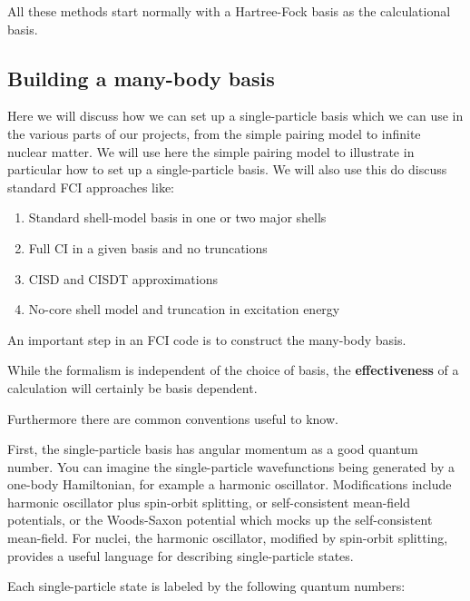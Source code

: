 \noindent
All these methods start normally with a Hartree-Fock basis as the calculational basis. 


\subsection{Building a many-body basis}

Here we will discuss how we can set up a single-particle basis which we can use in the various parts of our projects, from the simple pairing model to infinite nuclear matter. We will use here the simple pairing model to illustrate in particular how to set up a single-particle basis. We will also use this do discuss standard FCI approaches like:
\begin{enumerate}
 \item Standard shell-model basis in one or two major shells

 \item Full CI in a given basis and no truncations

 \item CISD and CISDT approximations

 \item No-core shell model and truncation in excitation energy
\end{enumerate}

\noindent
An important step in an FCI code  is to construct the many-body basis.  

While the formalism is independent of the choice of basis, the \textbf{effectiveness} of a calculation 
will certainly be basis dependent. 

Furthermore there are common conventions useful to know.

First, the single-particle basis has angular momentum as a good quantum number.  You can 
imagine the single-particle wavefunctions being generated by a one-body Hamiltonian, 
for example a harmonic oscillator.  Modifications include harmonic oscillator plus 
spin-orbit splitting, or self-consistent mean-field potentials, or the Woods-Saxon potential which mocks 
up the self-consistent mean-field. 
For nuclei, the harmonic oscillator, modified by spin-orbit splitting, provides a useful language 
for describing single-particle states.


Each single-particle state is labeled by the following quantum numbers: 

